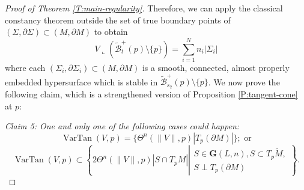 \documentclass[10pt]{amsart}
\theoremstyle{definition}
\theoremstyle{remark}
\numberwithin{equation}{section}
\newcommand{\lc}{\llcorner}
\newcommand{\Gr}{\mathbf{G}}
\newcommand{\tM}{\widetilde{M}}
\newcommand{\tBcal}{\widetilde{\mathcal{B}}}
\newcommand{\VarTan}{\operatorname{VarTan}}
\begin{document}
\begin{proof}[Proof of Theorem \ref{T:main-regularity}]
Therefore, we can apply the classical constancy theorem outside the set of true boundary points of $(\Sigma,\partial \Sigma) \subset (M,\partial M)$ to obtain
\[ V \lc (\tBcal^+_t(p) \setminus \{p\}) = \sum_{i=1}^N n_i |\Sigma_i|\]
where each $(\Sigma_i,\partial \Sigma_i) \subset (M,\partial M)$ is a smooth, connected, almost properly embedded hypersurface which is stable in $\tBcal^+_{s_2}(p) \setminus \{p\}$. We now prove the following claim, which is a strengthened version of Proposition \ref{P:tangent-cone} at $p$:

\vspace{.3cm}


\textit{Claim 5: One and only one of the following cases could happen:}
\[ \VarTan(V, p)=\{\Theta^n(\|V\|, p) |T_p(\partial M)|\}; \text{ or}\]
\[ \VarTan(V,p) \subset \left\{ 2\Theta^n(\|V\|,p) |S \cap T_pM| \left| \begin{array}{c} S \in \Gr(L,n), S \subset T_p \tM, \\
S \perp T_p(\partial M) \end{array} \right.\right\}. \]


\vspace{.3cm}


\end{proof}
\end{document}
